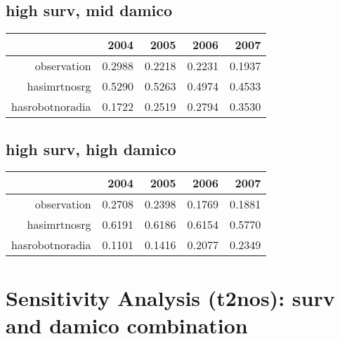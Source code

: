 \documentclass[12pt]{report}
\begin{document}
\subsection{high surv, mid damico}
\begin{table}[ht]
\begin{center}
\begin{tabular}{rrrrr}
  \hline
 & 2004 & 2005 & 2006 & 2007 \\ 
  \hline
observation & 0.2988 & 0.2218 & 0.2231 & 0.1937 \\ 
  hasimrtnosrg & 0.5290 & 0.5263 & 0.4974 & 0.4533 \\ 
  hasrobotnoradia & 0.1722 & 0.2519 & 0.2794 & 0.3530 \\ 
   \hline
\end{tabular}
\end{center}
\end{table}
\subsection{high surv, high damico}
\begin{table}[ht]
\begin{center}
\begin{tabular}{rrrrr}
  \hline
 & 2004 & 2005 & 2006 & 2007 \\ 
  \hline
observation & 0.2708 & 0.2398 & 0.1769 & 0.1881 \\ 
  hasimrtnosrg & 0.6191 & 0.6186 & 0.6154 & 0.5770 \\ 
  hasrobotnoradia & 0.1101 & 0.1416 & 0.2077 & 0.2349 \\ 
   \hline
\end{tabular}
\end{center}
\end{table}

\pagebreak
\section{Sensitivity Analysis (t2nos): surv and damico combination}
\end{document}
